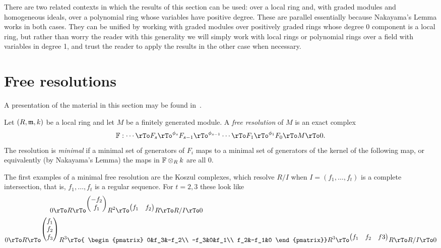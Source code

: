 \begin{remark}
 There are two related contexts in which the results of this section can be used: over a local ring and, with graded modules and homogeneous ideals, over a polynomial ring whose variables have positive degree. These are parallel essentially because Nakayama's Lemma works in both cases. They can be unified by working with graded modules over positively graded rings whose degree 0 component is a local ring, but rather than worry the reader with this generality we will simply work with local rings or polynomial rings over a field with variables in degree 1, and trust the reader to apply the results in the other case when necessary.
\end{remark}

\section{Free resolutions}
A presentation of the material in this section may be found in~\cite[Chapter ****]{Eisenbud1995}.


Let $(R,\mathfrak m, k)$ be a local ring and let $M$ be a finitely generated module. A \emph{free resolution} of $M$ is an exact complex
$$
\FF: \cdots \rTo F_s \rTo^{\phi_s} F_{s-1} \rTo^{\phi_{s-1}} \cdots \rTo F_1 \rTo^{\phi_1}  F_0 \rTo M \rTo 0.
$$
The resolution is \emph{minimal} if a minimal set of generators of $F_i$ maps to a minimal set of generators of the kernel of the following map,
or equivalently (by Nakayama's Lemma) the maps in ${\mathbb F}\otimes_R k$ are all 0.

The first examples of a minimal free resolution are the Koszul complexes, which resolve $R/I$ when
 $I = (f_1,\dots, f_t)$
is a complete intersection, that is, $f_1,\dots, f_t$ is a regular sequence.  For $t = 2,3$ these look like
$$
\begin{aligned}
 0\rTo &R \rTo^{
\begin{pmatrix}
-f_2\\f_1
\end{pmatrix}}
 R^2\rTo^{
 \begin{pmatrix}
f_1&f_2
\end{pmatrix}}
 R \rTo R/I \rTo 0\\
0\rTo R \rTo^{
\begin{pmatrix}
f_1\\f_2\\f_3
\end{pmatrix}} R^3&\rTo{
\begin{pmatrix}
 0&f_3&-f_2\\
 -f_3&0&f_1\\
 f_2&-f_1&0
\end{pmatrix}}
 R^3\rTo^{
 \begin{pmatrix}
f_1&f_2&f3
\end{pmatrix}}R \rTo R/I \rTo 0
\end{aligned}
$$


